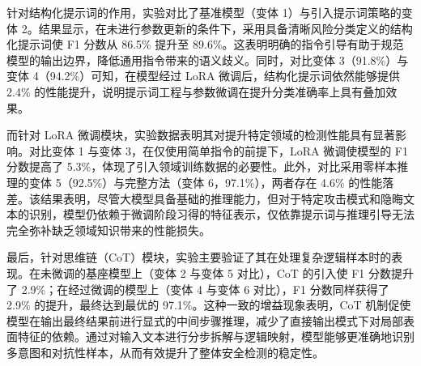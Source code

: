 \begin{table}[htbp] 
    \centering 
    \label{tab:ablation_study} 
\end{table}

针对结构化提示词的作用，实验对比了基准模型（变体 1）与引入提示词策略的变体 2。结果显示，在未进行参数更新的条件下，采用具备清晰风险分类定义的结构化提示词使 F1 分数从 86.5\% 提升至 89.6\%。这表明明确的指令引导有助于规范模型的输出边界，降低通用指令带来的语义歧义。同时，对比变体 3（91.8\%）与变体 4（94.2\%）可知，在模型经过 LoRA 微调后，结构化提示词依然能够提供 2.4\% 的性能提升，说明提示词工程与参数微调在提升分类准确率上具有叠加效果。

而针对 LoRA 微调模块，实验数据表明其对提升特定领域的检测性能具有显著影响。对比变体 1 与变体 3，在仅使用简单指令的前提下，LoRA 微调使模型的 F1 分数提高了 5.3\%，体现了引入领域训练数据的必要性。此外，对比采用零样本推理的变体 5（92.5\%）与完整方法（变体 6，97.1\%），两者存在 4.6\% 的性能落差。该结果表明，尽管大模型具备基础的推理能力，但对于特定攻击模式和隐晦文本的识别，模型仍依赖于微调阶段习得的特征表示，仅依靠提示词与推理引导无法完全弥补缺乏领域知识带来的性能损失。

最后，针对思维链（CoT）模块，实验主要验证了其在处理复杂逻辑样本时的表现。在未微调的基座模型上（变体 2 与变体 5 对比），CoT 的引入使 F1 分数提升了 2.9\%；在经过微调的模型上（变体 4 与变体 6 对比），F1 分数同样获得了 2.9\% 的提升，最终达到最优的 97.1\%。这种一致的增益现象表明，CoT 机制促使模型在输出最终结果前进行显式的中间步骤推理，减少了直接输出模式下对局部表面特征的依赖。通过对输入文本进行分步拆解与逻辑映射，模型能够更准确地识别多意图和对抗性样本，从而有效提升了整体安全检测的稳定性。

